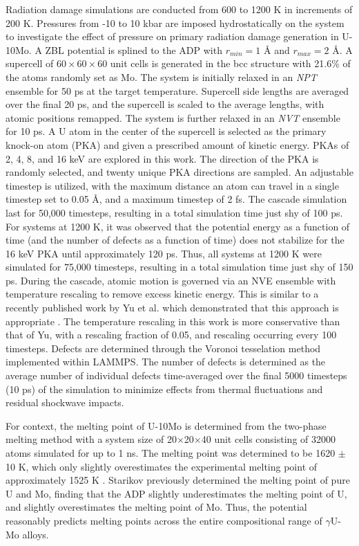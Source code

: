 \documentclass[review]{elsarticle}
\begin{document}
Radiation damage simulations are conducted from 600 to 1200 K in increments of 200 K. Pressures from -10 to 10 kbar are imposed hydrostatically on the system to investigate the effect of pressure on primary radiation damage generation in U-10Mo. A ZBL \cite{zbl} potential is splined to the ADP with $r_{min}=1$ {\AA} and $r_{max}=2$ {\AA}. A supercell of $60 \times 60 \times 60$ unit cells is generated in the bcc structure with 21.6\% of the atoms randomly set as Mo. The system is initially relaxed in an \textit{NPT} ensemble for 50 ps at the target temperature. Supercell side lengths are averaged over the final 20 ps, and the supercell is scaled to the average lengths, with atomic positions remapped. The system is further relaxed in an \textit{NVT} ensemble for 10 ps. A U atom in the center of the supercell is selected as the primary knock-on atom (PKA) and given a prescribed amount of kinetic energy. PKAs of 2, 4, 8, and 16 keV are explored in this work. The direction of the PKA is randomly selected, and twenty unique PKA directions are sampled. An adjustable timestep is utilized, with the maximum distance an atom can travel in a single timestep set to 0.05 {\AA}, and a maximum timestep of 2 fs. The cascade simulation last for 50,000 timesteps, resulting in a total simulation time just shy of 100 ps. For systems at 1200 K, it was observed that the potential energy as a function of time (and the number of defects as a function of time) does not stabilize for the 16 keV PKA until approximately 120 ps. Thus, all systems at 1200 K were simulated for 75,000 timesteps, resulting in a total simulation time just shy of 150 ps. During the cascade, atomic motion is governed via an NVE ensemble with temperature rescaling to remove excess kinetic energy. This is similar to a recently published work by Yu et al. which demonstrated that this approach is appropriate \cite{yu2024}. The temperature rescaling in this work is more conservative than that of Yu, with a rescaling fraction of 0.05, and rescaling occurring every 100 timesteps. Defects are determined through the Voronoi tesselation method implemented within LAMMPS. The number of defects is determined as the average number of individual defects time-averaged over the final 5000 timesteps (10 ps) of the simulation to minimize effects from thermal fluctuations and residual shockwave impacts. 

For context, the melting point of U-10Mo is determined from the two-phase melting method \cite{melting1,melting2} with a system size of 20$\times$20$\times$40 unit cells consisting of 32000 atoms simulated for up to 1 ns. The melting point was determined to be 1620 $\pm$ 10 K, which only slightly overestimates the experimental melting point of approximately 1525 K \cite{u-mo_phase_diagram}. Starikov \cite{starikov2018} previously determined the melting point of pure U and Mo, finding that the ADP slightly underestimates the melting point of U, and slightly overestimates the melting point of Mo. Thus, the potential reasonably predicts melting points across the entire compositional range of $\gamma$U-Mo alloys.
\end{document}
